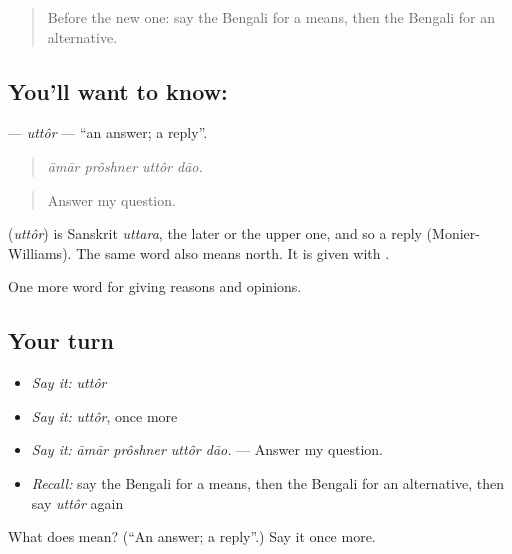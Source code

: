 \begin{quote}
Before the new one: say the Bengali for a means, then the Bengali for an alternative.
\end{quote}

\subsection*{You'll want to know: }
\textbf{} — \emph{uttôr} — \textquotedblleft{}an answer; a reply\textquotedblright{}.

\begin{quote}
   
\end{quote}

\begin{quote}
\emph{āmār prôshner uttôr dāo.}
\end{quote}

\begin{quote}
Answer my question.
\end{quote}

\begin{cousinweb}
\textbf{} (\emph{uttôr}) is Sanskrit \emph{uttara}, the later or the upper one, and so a reply (Monier-Williams). The same word also means north. It is given with .
\end{cousinweb}

\begin{grammarlens}[title={What you've built}]
One more word for giving reasons and opinions.
\end{grammarlens}

\subsection*{Your turn}
\begin{itemize}
\raggedright
  \item \emph{Say it:} \emph{uttôr}
  \item \emph{Say it:} \emph{uttôr}, once more
  \item \emph{Say it:} \emph{āmār prôshner uttôr dāo.} — Answer my question.
  \item \emph{Recall:} say the Bengali for a means, then the Bengali for an alternative, then say \emph{uttôr} again
\end{itemize}

\begin{tcolorbox}[breakable,colback=teal!4,colframe=teal!35!black,title={Before you move on}]
What does  mean? (\textquotedblleft{}An answer; a reply\textquotedblright{}.) Say it once more.
\end{tcolorbox}

